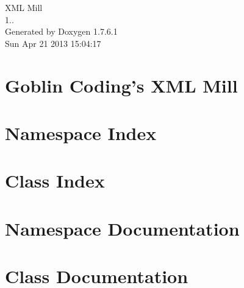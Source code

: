 \documentclass[a4paper]{book}
\begin{document}
\hypersetup{pageanchor=false,citecolor=blue}
\begin{titlepage}
\vspace*{7cm}
\begin{center}
{\Large \-X\-M\-L \-Mill \\[1ex]\large 1.. }\\
\vspace*{1cm}
{\large \-Generated by Doxygen 1.7.6.1}\\
\vspace*{0.5cm}
{\small Sun Apr 21 2013 15:04:17}\\
\end{center}
\end{titlepage}
\clearemptydoublepage
{}
\tableofcontents
\clearemptydoublepage
{}
\hypersetup{pageanchor=true,citecolor=blue}
\chapter{\-Goblin \-Coding's \-X\-M\-L \-Mill}
\label{index}\hypertarget{index}{}
\chapter{\-Namespace \-Index}

\chapter{\-Class \-Index}

\chapter{\-Namespace \-Documentation}


\chapter{\-Class \-Documentation}
















\printindex
\end{document}

